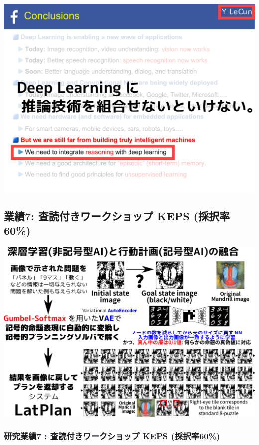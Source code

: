 \includegraphics{img/lecun.png}

\subsection{業績7: 査読付きワークショップ KEPS (採択率60\%)}
\label{sec-2-4}

\begin{resume}
\end{resume}

\includegraphics{img/keps17.png}

\subsubsection{研究業績7 : 査読付きワークショップ KEPS (採択率60\%)}
\label{sec-2-4-1}

